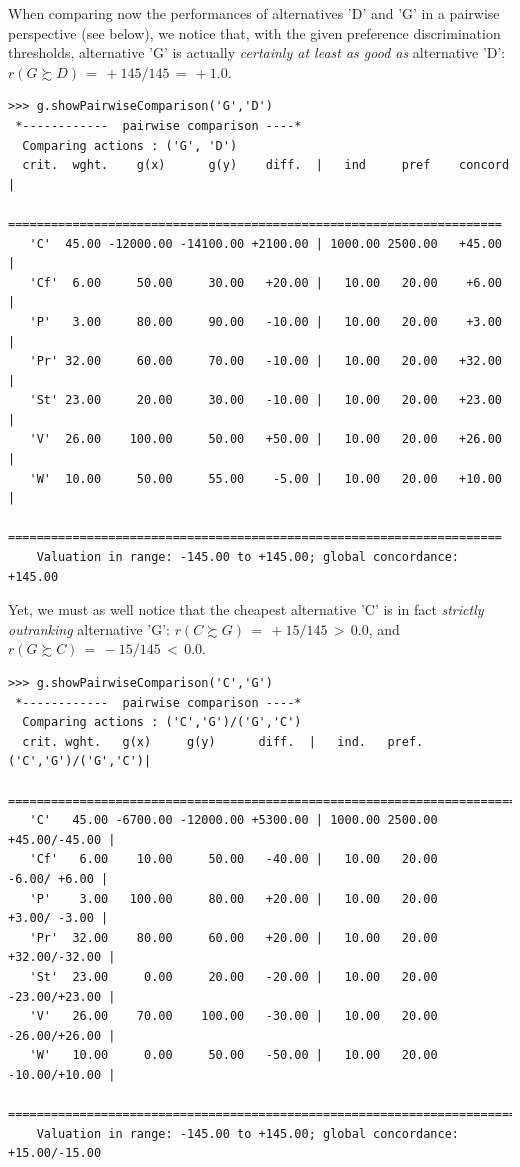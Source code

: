 When comparing now the performances of alternatives 'D' and 'G' in a pairwise perspective (see below), we notice that, with the given preference discrimination thresholds, alternative 'G' is actually \emph{certainly at least as good as} alternative 'D':  $r(G \succsim D)\, = \, +145/145\, =\, +1.0$.
\begin{lstlisting}[caption={Inspecting pairwise comparisons},label=list:6.5,basicstyle=\scriptsize]
>>> g.showPairwiseComparison('G','D')
 *------------  pairwise comparison ----*
  Comparing actions : ('G', 'D')
  crit.  wght.    g(x)      g(y)    diff.  |   ind     pref    concord 	|
   =====================================================================
   'C'  45.00 -12000.00 -14100.00 +2100.00 | 1000.00 2500.00   +45.00 	| 
   'Cf'  6.00     50.00     30.00   +20.00 |   10.00   20.00    +6.00 	| 
   'P'   3.00     80.00     90.00   -10.00 |   10.00   20.00    +3.00 	| 
   'Pr' 32.00     60.00     70.00   -10.00 |   10.00   20.00   +32.00 	| 
   'St' 23.00     20.00     30.00   -10.00 |   10.00   20.00   +23.00 	| 
   'V'  26.00    100.00     50.00   +50.00 |   10.00   20.00   +26.00 	| 
   'W'  10.00     50.00     55.00    -5.00 |   10.00   20.00   +10.00 	|
   =====================================================================
    Valuation in range: -145.00 to +145.00; global concordance: +145.00
\end{lstlisting}

Yet, we must as well notice that the cheapest alternative 'C' is in fact \emph{strictly outranking} alternative 'G':  $r(C \succsim G)\, =\, +15/145\, >\, 0.0$, and $r(G \succsim C)\, =\, -15/145 \,<\, 0.0$.
\begin{lstlisting}[basicstyle=\scriptsize]
>>> g.showPairwiseComparison('C','G')
 *------------  pairwise comparison ----*
  Comparing actions : ('C','G')/('G','C')
  crit. wght.   g(x)     g(y)      diff.  |   ind.   pref. ('C','G')/('G','C')|
   ===========================================================================
   'C'   45.00 -6700.00 -12000.00 +5300.00 | 1000.00 2500.00    +45.00/-45.00 | 
   'Cf'   6.00    10.00     50.00   -40.00 |   10.00   20.00     -6.00/ +6.00 | 
   'P'    3.00   100.00     80.00   +20.00 |   10.00   20.00     +3.00/ -3.00 | 
   'Pr'  32.00    80.00     60.00   +20.00 |   10.00   20.00    +32.00/-32.00 | 
   'St'  23.00     0.00     20.00   -20.00 |   10.00   20.00    -23.00/+23.00 | 
   'V'   26.00    70.00    100.00   -30.00 |   10.00   20.00    -26.00/+26.00 | 
   'W'   10.00     0.00     50.00   -50.00 |   10.00   20.00    -10.00/+10.00 |
   ===========================================================================
    Valuation in range: -145.00 to +145.00; global concordance: +15.00/-15.00
\end{lstlisting}
  
